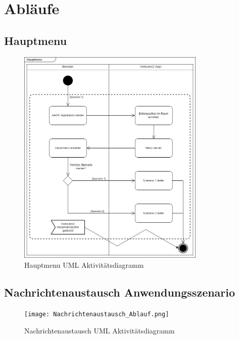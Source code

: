 \chapter{Abläufe}

\section{Hauptmenu}
\begin{figure}[htbp]
	\centering
	\includegraphics[width=0.80\textwidth]{images/Hauptmenu_Ablauf}
	\caption{Hauptmenu UML Aktivitätsdiagramm}
\end{figure}
\newpage

\section{Nachrichtenaustausch Anwendungsszenario}
\begin{figure}[htbp]
	\centering
	\texttt{[image: Nachrichtenaustausch\_Ablauf.png]}
	\caption{Nachrichtenaustausch UML Aktivitätsdiagramm}
\end{figure}
\newpage

